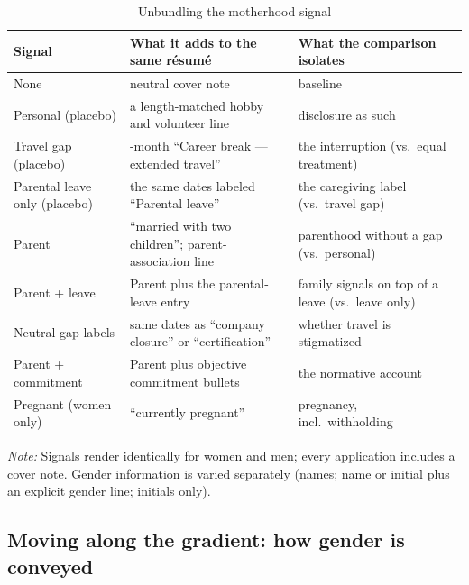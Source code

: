 \documentclass[11pt]{article}
\begin{document}
\begin{table}[tbp]
\centering\small
\caption{Unbundling the motherhood signal}\label{tab:cues}
\begin{tabularx}{\textwidth}{@{}l>{\raggedright\arraybackslash}X>{\raggedright\arraybackslash}X@{}}
\toprule
Signal & What it adds to the same résumé & What the comparison isolates \\
\midrule
None & neutral cover note & baseline \\
Personal (placebo) & a length-matched hobby and volunteer line & disclosure as such \\
Travel gap (placebo) & 8-month ``Career break --- extended travel'' & the interruption (vs.\ equal treatment) \\
Parental leave only (placebo) & the same dates labeled ``Parental leave'' & the caregiving label (vs.\ travel gap) \\
Parent & ``married with two children''; parent-association line & parenthood without a gap (vs.\ personal) \\
Parent + leave & Parent plus the parental-leave entry & family signals on top of a leave (vs.\ leave only) \\
\addlinespace
Neutral gap labels & same dates as ``company closure'' or ``certification'' & whether travel is stigmatized \\
Parent + commitment & Parent plus objective commitment bullets & the normative account \\
Pregnant (women only) & ``currently pregnant'' & pregnancy, incl.\ withholding \\
\bottomrule
\end{tabularx}
\begin{minipage}{\textwidth}\footnotesize\vspace{3pt}
\emph{Note:} Signals render identically for women and men; every application includes a cover note. Gender information is varied separately (names; name or initial plus an explicit gender line; initials only).
\end{minipage}
\end{table}

\hypertarget{moving-along-the-gradient-how-gender-is-conveyed}{%
\subsection{Moving along the gradient: how gender is
conveyed}\label{moving-along-the-gradient-how-gender-is-conveyed}}
\end{document}

